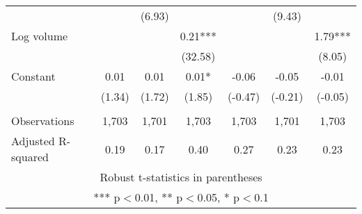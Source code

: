 \documentclass[]{article}
\begin{document}
\begin{tabular}{lcccccc}
 &  & (6.93) &  &  & (9.43) &  \\
Log volume &  &  & 0.21*** &  &  & 1.79*** \\
 &  &  & (32.58) &  &  & (8.05) \\
Constant & 0.01 & 0.01 & 0.01* & -0.06 & -0.05 & -0.01 \\
 & (1.34) & (1.72) & (1.85) & (-0.47) & (-0.21) & (-0.05) \\
 &  &  &  &  &  &  \\
Observations & 1,703 & 1,701 & 1,703 & 1,703 & 1,701 & 1,703 \\
 Adjusted R-squared & 0.19 & 0.17 & 0.40 & 0.27 & 0.23 & 0.23 \\ \hline
\multicolumn{7}{c}{ Robust t-statistics in parentheses} \\
\multicolumn{7}{c}{ *** p$<$0.01, ** p$<$0.05, * p$<$0.1} \\
\end{tabular}
\end{document}
